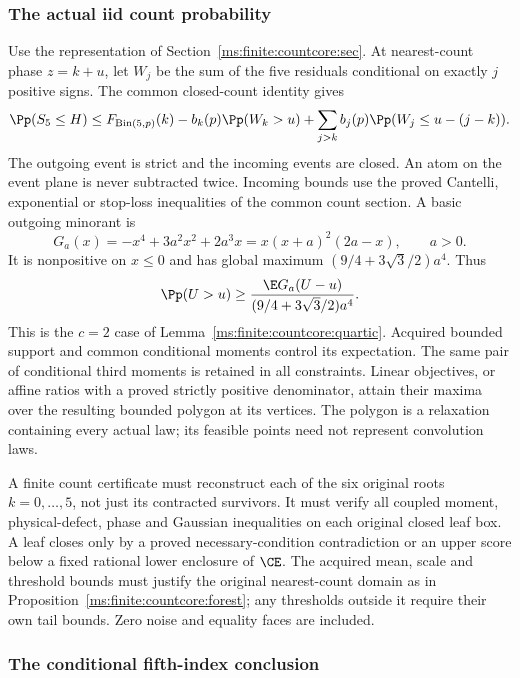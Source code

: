 \subsubsection{The actual iid count probability}

Use the representation of Section~\ref{ms:finite:countcore:sec}. At nearest-count
phase $z=k+u$, let $W_j$ be the sum of the five residuals conditional on
exactly $j$ positive signs. The common closed-count identity gives
\begin{equation}\label{ms:finite:five:eq:outgoing}
 \Pp(S_5\le H)\le F_{\mathrm{Bin}(5,p)}(k)
 -b_k(p)\Pp(W_k>u)
 +\sum_{j>k}b_j(p)\Pp(W_j\le u-(j-k)).
\end{equation}
The outgoing event is strict and the incoming events are closed.
An atom on the event plane is never subtracted twice.
Incoming bounds use the proved Cantelli, exponential or stop-loss
inequalities of the common count section. A basic outgoing minorant is
\[
 G_a(x)=-x^4+3a^2x^2+2a^3x=x(x+a)^2(2a-x),\qquad a>0.
\]
It is nonpositive on $x\le0$ and has global maximum
$(9/4+3\sqrt3/2)a^4$. Thus
\[
 \Pp(U>u)\ge\frac{\E G_a(U-u)}{(9/4+3\sqrt3/2)a^4}.
\]
This is the $c=2$ case of Lemma~\ref{ms:finite:countcore:quartic}.
Acquired bounded support and common conditional moments control its
expectation. The same pair of conditional third moments is retained in
all constraints. Linear objectives, or affine ratios with a proved
strictly positive denominator, attain their maxima over the resulting
bounded polygon at its vertices. The polygon is a relaxation containing
every actual law; its feasible points need not represent convolution laws.

A finite count certificate must reconstruct each of the six original
roots $k=0,\ldots,5$, not just its contracted survivors. It must verify
all coupled moment, physical-defect, phase and Gaussian inequalities on
each original closed leaf box. A leaf closes only by a proved
necessary-condition contradiction or an upper score below a fixed
rational lower enclosure of $\CE$. The acquired mean, scale and
threshold bounds must justify the original nearest-count domain as in
Proposition~\ref{ms:finite:countcore:forest}; any thresholds outside it require
their own tail bounds. Zero noise and equality faces are included.

\subsubsection{The conditional fifth-index conclusion}

